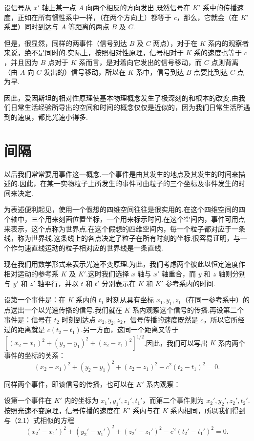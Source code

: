 设信号从 $x'$ 轴上某一点 $A$ 向两个相反的方向发出.既然信号在 $K'$ 系中的传播速度，正如在所有惯性系中一样，（在两个方向上）都等于 $c$，那么，它就会（在 $K'$ 系里）同时到达与 $A$ 等距离的两点 $B$ 及 $C$.

但是，很显然，同样的两事件（信号到达 $B$ 及 $C$ 两点），对于在 $K$ 系内的观察者来说，绝不是同时的.实际上，按照相对性原理，信号相对于 $K$ 系的速度也等于 $c$，并且因为 $B$ 点对于 $K$ 系而言，是对着向它发出的信号移动，而 $C$ 点则背离（由 $A$ 向 $C$ 发出的）信号移动，所以在 $K$ 系中，信号到达 $B$ 点要比到达 $C$ 点为早.

因此，爱因斯坦的相对性原理使基本物理概念发生了极深刻的和根本的改变.由我们日常生活经验所导出的空间和时间的概念仅仅是近似的，因为我们日常生活所遇到的速度，都比光速小得多.

\section{间隔}

以后我们常常要用事件这一概念.一个事件是由其发生的地点及其发生的时间来描述的.因此，在某一实物粒子上所发生的事件可由粒子的三个坐标及事件发生的时间来决定.

为表述便利起见，使用一个假想的四维空间往往是很实用的.在这个四维空间的四个轴中，三个用来刻画位置坐标，一个用来标示时间.在这个空间内，事件可用点来表示，这个点称为世界点.在这个假想的四维空间内，每一个粒子都对应于一条线，称为世界线.这条线上的各点决定了粒子在所有时刻的坐标.很容易证明，与一个作匀速直线运动的粒子相对应的世界线是一条直线.

现在我们用数学形式来表示光速不变原理.为此，我们考虑两个彼此以恒定速度作相对运动的参考系 $K$ 及 $K'$.这时我们选择 $x$ 轴与 $x'$ 轴重合，而 $y$ 和 $z$ 轴则分别与 $y'$ 和 $z'$ 轴平行，并以 $t$ 和 $t'$ 分别表示在 $K$ 和 $K'$ 参考系内的时间.

设第一个事件是：在 $K$ 系内的 $t_1$ 时刻从具有坐标 $x_1,y_1,z_1$（在同一参考系中）的点送出一个以光速传播的信号.我们就在 $K$ 系内观察这个信号的传播.再设第二个事件是：信号在 $t_2$ 时刻到达点 $x_2,y_2,z_2$，信号传播的速度既然是 $c$，所以它所经过的距离就是 $c(t_2-t_1)$.另一方面，这同一个距离又等于 $[(x_2-x_1)^2+(y_2-y_1)^2+(z_2-z_1)^2]^{1/2}$.因此，我们可以写出 $K$ 系内两个事件的坐标的关系：
\begin{equation}
  (x_2-x_1)^2+(y_2-y_1)^2+(z_2-z_1)^2-c^2(t_2-t_1)^2=0.
\end{equation}

同样两个事件，即该信号的传播，也可以在 $K'$ 系内观察：

设第一个事件在 $K'$ 内的坐标为 $x_1',y_1',z_1',t_1'$，而第二个事件则为 $x_2',y_2',z_2',t_2'$.按照光速不变原理，信号传播的速度在 $K'$ 系内与在 $K$ 系内相同，所以我们得到与（2.1）式相似的方程
\begin{equation}
  (x_2'-x_1')^2+(y_2'-y_1')^2+(z_2'-z_1')^2-c^2(t_2'-t_1')^2=0.
\end{equation}

